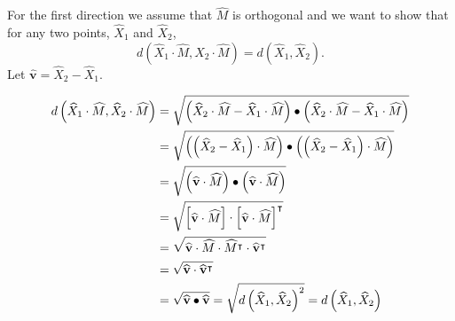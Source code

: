 \documentclass[newpage,hints,handout]{ximera}
\begin{document}
\begin{problem}
  
\begin{freeResponse}
For the first direction we assume that $\hat{M}$ is orthogonal and we want to show that for any two points,  $\hat{X}_{1}$ and $\hat{X}_{2}$,%
\[
   d\left( \hat{X}_{1}  \cdot\hat{M},\hat{X}_{2}
   \cdot\hat{M}\right)  =d\left(  \hat{X}_{1},\hat{X}_{2}\right).
\]
Let $ \hat{\mathbf v}=\hat{X}_{2}-\hat{X}_{1}$.

\begin{align*}
   d\left( \widehat{X}_{1}  \cdot\widehat{M},\widehat{X}_{2}
   \cdot\widehat{M}\right) &= \sqrt{\left(\widehat{X}_{2}  \cdot\widehat{M}-\widehat{X}_{1}  \cdot\widehat{M}\right) \bullet \left(\widehat{X}_{2}  	\cdot\widehat{M}-\widehat{X}_{1}  \cdot\widehat{M}\right)} \\
   & = \sqrt{\left( \left( \widehat{X}_{2}-\widehat{X}_{1} \right) \cdot\widehat{M}\right) \bullet \left( \left( \widehat{X}_{2}-\widehat{X}_{1} 		\right) \cdot\widehat{M}\right)} \\
   & = \sqrt{ \left(\widehat{\mathbf v}\cdot\widehat{M} \right) \bullet \left(\widehat{\mathbf v}\cdot\widehat{M} \right)}\\
   & = \sqrt{
       \begin{bmatrix}
          \widehat{\mathbf v}\cdot\widehat{M}
       \end{bmatrix} \cdot
       \begin{bmatrix}
          \widehat{\mathbf v}\cdot\widehat{M}
       \end{bmatrix}^\intercal}\\
   & = \sqrt{ \widehat{\mathbf v}\cdot\widehat{M} \cdot \widehat{M}^\intercal \cdot \widehat{\mathbf v}^\intercal} \\
   & = \sqrt{ \widehat{\mathbf v} \cdot \widehat{\mathbf v}^\intercal} \\
   & = \sqrt{\widehat{\mathbf v} \bullet \widehat{\mathbf v}} = \sqrt{d\left(  \widehat{X}_{1},\widehat{X}_{2}\right)^2} = d\left( \widehat{X}_{1},\widehat{X}_{2}\right)
\end{align*}


\end{freeResponse}
\end{problem}
\end{document}
